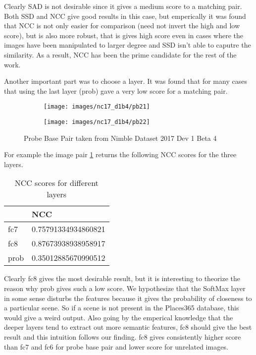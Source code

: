 \documentclass{article}
\begin{document}
Clearly SAD is not desirable since it gives a medium score to a matching pair. Both SSD and NCC give good results in this case, but emperically it was found that NCC is not only easier for comparison (need not invert the high and low score), but is also more robust, that is gives high score even in cases where the images have been manipulated to larger degree and SSD isn't able to caputre the similarity. As a result, NCC has been the prime candidate for the rest of the work.

Another important part was to choose a layer. It was found that for many cases that using the last layer (prob) gave a very low score for a matching pair.

\begin{figure}[H]
  \centering
  \begin{subfigure}[t]{0.5\textwidth}
    \centering
    \texttt{[image: images/nc17\_d1b4/pb21]}
  \end{subfigure}
  \begin{subfigure}[t]{0.45\textwidth}
    \centering
    \texttt{[image: images/nc17\_d1b4/pb22]}
  \end{subfigure}
  \caption{Probe Base Pair taken from Nimble Dataset 2017 Dev 1 Beta 4}
  \label{fig:fc8_good}
\end{figure}

For example the image pair \ref{fig:fc8_good} returns the following NCC scores for the three layers.
\begin{table}[H]
\centering
\caption{NCC scores for different layers}
\label{my-label}
\begin{tabular}{|l|l|}
  \hline
  & NCC                 \\
  \hline
  fc7  & 0.75791334934860821 \\
  fc8  & 0.87673938938958917 \\
  prob & 0.35012885670990512 \\
  \hline
\end{tabular}
\end{table}

Clearly fc8 gives the most desirable result, but it is interesting to theorize the reason why prob gives such a low score. We hypothesize that the SoftMax layer in some sense disturbs the features because it gives the probability of closeness to a particular scene. So if a scene is not present in the Places365 database, this would give a weird output. Also going by the emperical knowledge that the deeper layers tend to extract out more semantic features, fc8 should give the best result and this intuition follows our finding. fc8 gives consistently higher score than fc7 and fc6 for probe base pair and lower score for unrelated images.
\end{document}
